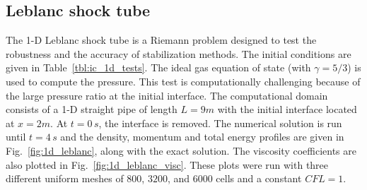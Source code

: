 \documentclass[preprint,10pt]{elsarticle}
\newcommand{\fig}[1]{Fig.~\ref{#1}}                      %
\newcommand{\tbl}[1]{Table~\ref{#1}}                     %
\begin{document}
\subsection{Leblanc shock tube} \label{sec:Leblanc}

The 1-D Leblanc shock tube is a Riemann problem designed to test the robustness and the accuracy of stabilization methods. 
The initial conditions are given in \tbl{tbl:ic_1d_tests}. The ideal gas equation of state (with $\gamma=5/3$) is used to 
compute the pressure.
This test is computationally challenging because of the large pressure ratio at the initial interface.
The computational domain consists of a 1-D straight pipe of length $L=9m$ with the initial interface located at $x=2m$. 
At $t=0\,s$, the interface is removed. The numerical solution is run until $t=4\,s$ and the density, momentum and 
total energy profiles are given in \fig{fig:1d_leblanc}, along with the exact solution. The viscosity coefficients 
are also plotted in \fig{fig:1d_leblanc_visc}. These plots were run with three different uniform meshes of $800$, 
$3200$, and $6000$ cells and a constant $CFL = 1$.
\end{document}
